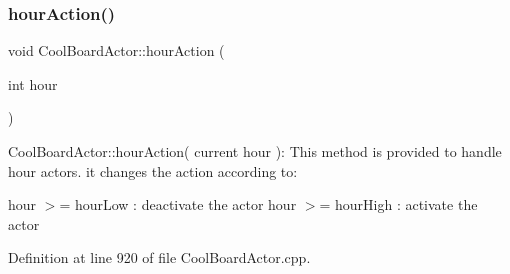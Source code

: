 \subsubsection{\texorpdfstring{hour\+Action()}{hourAction()}}
{\footnotesize\ttfamily void Cool\+Board\+Actor\+::hour\+Action (\begin{DoxyParamCaption}\item[{int}]{hour }\end{DoxyParamCaption})}

Cool\+Board\+Actor\+::hour\+Action( current hour )\+: This method is provided to handle hour actors. it changes the action according to\+:

hour $>$= hour\+Low \+: deactivate the actor hour $>$= hour\+High \+: activate the actor 

Definition at line 920 of file Cool\+Board\+Actor.\+cpp.


